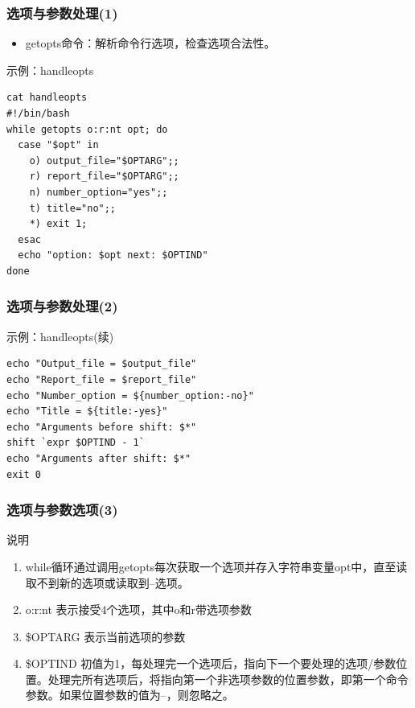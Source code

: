 \documentclass[xcolor=svgnames,presentation]{beamer}
\begin{document}
\begin{frame}[fragile]
\frametitle{选项与参数处理(1)}
\label{sec-1-3-16}
\begin{itemize}

\item getopts命令：解析命令行选项，检查选项合法性。
\label{sec-1-3-16-1}%
\end{itemize} %
\begin{exampleblock}{示例：handleopts}
\label{sec-1-3-16-2}


\begin{verbatim}
cat handleopts
#!/bin/bash
while getopts o:r:nt opt; do
  case "$opt" in
    o) output_file="$OPTARG";;
    r) report_file="$OPTARG";;
    n) number_option="yes";;
    t) title="no";;
    *) exit 1;
  esac
  echo "option: $opt next: $OPTIND"
done
\end{verbatim}
\end{exampleblock}
\end{frame}
\begin{frame}[fragile]
\frametitle{选项与参数处理(2)}
\label{sec-1-3-17}
\begin{exampleblock}{示例：handleopts(续)}
\label{sec-1-3-17-1}


\begin{verbatim}
echo "Output_file = $output_file"
echo "Report_file = $report_file"
echo "Number_option = ${number_option:-no}"
echo "Title = ${title:-yes}"
echo "Arguments before shift: $*"
shift `expr $OPTIND - 1`
echo "Arguments after shift: $*"
exit 0
\end{verbatim}
\end{exampleblock}
\end{frame}
\begin{frame}
\frametitle{选项与参数选项(3)}
\label{sec-1-3-18}
\begin{exampleblock}{说明}
\label{sec-1-3-18-1}

\begin{enumerate}
\item while循环通过调用getopts每次获取一个选项并存入字符串变量opt中，直至读取不到新的选项或读取到--选项。
\item o:r:nt  表示接受4个选项，其中o和r带选项参数
\item \$OPTARG 表示当前选项的参数
\item \$OPTIND 初值为1，每处理完一个选项后，指向下一个要处理的选项/参数位置。处理完所有选项后，将指向第一个非选项参数的位置参数，即第一个命令参数。如果位置参数的值为--，则忽略之。
\end{enumerate}
\end{exampleblock}
\end{frame}
\end{document}

